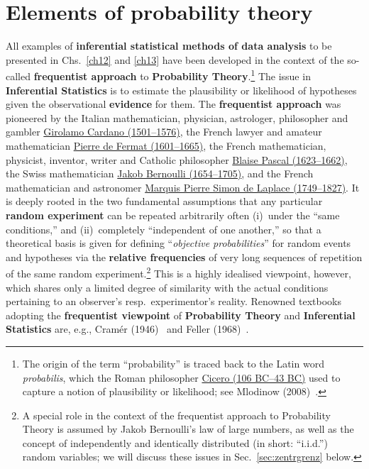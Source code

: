 \chapter[Elements of probability theory]{Elements of probability
theory}
All examples of \textbf{inferential statistical methods of data 
analysis} to be presented in Chs.~\ref{ch12} and \ref{ch13} have 
been developed in the context of the so-called \textbf{frequentist 
approach} to \textbf{Probability Theory}.\footnote{The origin of
the term ``probability'' is traced back to the Latin word 
\textit{probabilis}, which the Roman philosopher 
\href{https://en.wikipedia.org/wiki/Cicero}{Cicero (106 BC--43 
BC)} used to capture a notion of plausibility or likelihood; see 
Mlodinow (2008)~.} The issue in
\textbf{Inferential Statistics} is to estimate the plausibility or
likelihood of hypotheses given the observational \textbf{evidence}
for them. The \textbf{frequentist approach} was pioneered by the
Italian mathematician, physician, astrologer, philosopher and
gambler 
\href{http://www-history.mcs.st-and.ac.uk/Biographies/Cardan.html}{Girolamo Cardano (1501--1576)}, the French lawyer and amateur mathematician  
\href{http://www-history.mcs.st-and.ac.uk/Biographies/Fermat.html}{Pierre
de Fermat (1601--1665)}, the French mathematician, 
physicist, inventor, writer and Catholic philosopher 
\href{http://www-history.mcs.st-and.ac.uk/Biographies/Pascal.html}{Blaise Pascal (1623--1662)}, the Swiss mathematician
\href{http://www-history.mcs.st-and.ac.uk/Biographies/Bernoulli_Jacob.html}{Jakob Bernoulli (1654--1705)}, and the French 
mathematician and astronomer
\href{http://www-history.mcs.st-and.ac.uk/Biographies/Laplace.html}{Marquis Pierre Simon de Laplace (1749--1827)}. It is deeply 
rooted in the two fundamental assumptions that any particular 
\textbf{random experiment} can be repeated arbitrarily often 
(i)~under the ``same conditions,'' and (ii)~completely 
``independent of one another,'' so that a theoretical basis is 
given for defining ``\textit{objective probabilities}'' for random 
events and hypotheses via the \textbf{relative frequencies} of very
long sequences of repetition of the same random
experiment.\footnote{A special role in the context of the
frequentist approach to Probability Theory is assumed by Jakob
Bernoulli's law of large numbers, as well as the concept of
independently and identically distributed 
(in short: ``i.i.d.'') random variables; we will discuss these 
issues in Sec.~\ref{sec:zentrgrenz} below.} This is a highly 
idealised viewpoint, however, which shares only a limited degree 
of similarity with the actual conditions pertaining to an 
observer's resp.~experimentor's reality. Renowned textbooks 
adopting the \textbf{frequentist viewpoint} of \textbf{Probability
Theory} and  \textbf{Inferential Statistics} are, e.g., Cram\'{e}r 
(1946)~ and Feller (1968)~.

